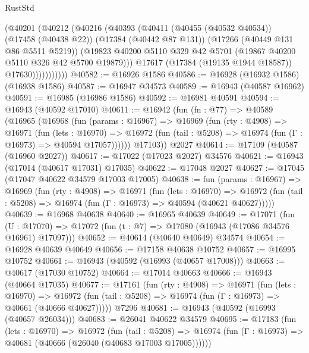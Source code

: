 \begin{lexlean}{RustStd}
\begin{coremodule}
                  (@40201
                    (@40212
                      (@40216
                        (@40393
                          (@40411
                            (@40455 (@40532 @40534))
                            (@17458 (@40438 @22))
                            (@17384 (@40442 @87 @131))
                            (@17266 (@40449 @131 @86 @5511 @5219))
                            (@19823
                              @40200
                              @5110
                              @329
                              @42
                              @5701
                              (@19867 @40200 @5110 @326 @42 @5700 @19879)))
                          @17617
                          (@17384 (@19135 @1944 @18587))
                          @17630)))))))))))
@40582 := @16926 @1586
@40586 := @16928 (@16932 @1586) (@16938 @1586)
@40587 := @16947 @34573
@40589 := @16943 (@40587 @16962)
@40591 := @16985 (@16986 @1586)
@40592 := @16981 @40591
@40594 := @16943 (@40592 @17010)
@40611 := @16942
    (fun (fn : @77) =>
    @40589
      (@16965
        (@16968
          (fun (params : @16967) =>
          @16969
            (fun (rty : @4908) =>
            @16971
              (fun (lets : @16970) =>
              @16972 (fun (tail : @5208) => @16974 (fun (Γ : @16973) => @40594 @17057))))))
        @17103))
    @2027
@40614 := @17109 (@40587 (@16960 @2027))
@40617 := @17022 (@17023 @2027) @34576
@40621 := @16943 (@17014 (@40617 @17031) @17035)
@40622 := @17048 @2027
@40627 := @17045 (@17047 @40622 @34579 @17003 @17005)
@40638 := fun (params : @16967) =>
  @16969
    (fun (rty : @4908) =>
    @16971
      (fun (lets : @16970) =>
      @16972 (fun (tail : @5208) => @16974 (fun (Γ : @16973) => @40594 (@40621 @40627)))))
@40639 := @16968 @40638
@40640 := @16965 @40639
@40649 := @17071
    (fun (U : @17070) => @17072 (fun (t : @7) => @17080 (@16943 (@17086 @34576 @16961) @17097)))
@40652 := @40614 (@40640 @40649) @34574
@40654 := @16928 @40639 @40649
@40656 := @17158 @40638 @10752
@40657 := @16995 @10752
@40661 := @16943 (@40592 (@16993 (@40657 @17008)))
@40663 := @40617 (@17030 @10752)
@40664 := @17014 @40663
@40666 := @16943 (@40664 @17035)
@40677 := @17161
    (fun (rty : @4908) =>
    @16971
      (fun (lets : @16970) =>
      @16972 (fun (tail : @5208) => @16974 (fun (Γ : @16973) => @40661 (@40666 @40627)))))
    @7296
@40681 := @16943 (@40592 (@16993 (@40657 @26034)))
@40683 := @26041 @40622 @34579
@40695 := @17183
    (fun (lets : @16970) =>
    @16972
      (fun (tail : @5208) =>
      @16974 (fun (Γ : @16973) => @40681 (@40666 (@26040 (@40683 @17003 @17005))))))

\end{coremodule}
\end{lexlean}
